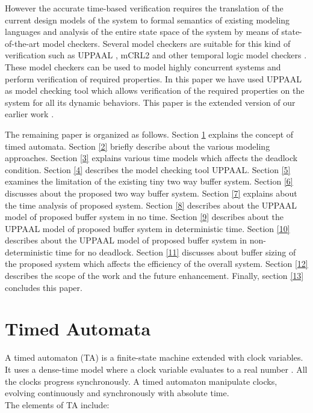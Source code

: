 \documentclass[letterpaper]{article}
\begin{document}
\par However the accurate time-based verification requires the translation of the current design models of the system to formal semantics of existing modeling languages and analysis of the entire state space of the system by means of state-of-the-art model checkers. Several model checkers are suitable for this kind of verification such as UPPAAL \cite{GDK04}\cite{JKF95}, mCRL2 \cite{JAMY06} and other temporal logic model checkers \cite{WIKI12}. These model checkers can be used to model highly concurrent systems and perform verification of required properties. In this paper we have used UPPAAL as  model checking tool which allows  verification of the required properties on the system for all its dynamic behaviors. This paper is the extended version of our earlier work \cite{REF13}.
\par
The remaining paper is organized as follows. Section \ref{1} explains the concept of timed automata. Section \ref{2} briefly describe about the various modeling approaches. Section \ref{3} explains various time models which affects the deadlock condition. Section \ref{4} describes the model checking tool UPPAAL. Section \ref{5} examines the limitation of the existing tiny two way buffer system. Section \ref{6} discusses about the proposed two way buffer system.  Section \ref{7} explains about the time analysis of proposed system. Section \ref{8} describes about the UPPAAL model of proposed buffer system in no time. Section \ref{9} describes about the UPPAAL model of proposed buffer system in deterministic time. Section \ref{10} describes about the UPPAAL model of proposed buffer system in non-deterministic time for no deadlock. Section \ref{11} discusses about buffer sizing of the proposed system which affects the efficiency of the overall system. Section \ref{12} describes the scope of the work and the future enhancement. Finally, section \ref{13} concludes this paper.

\section{Timed Automata}
\label{1}
A timed automaton (TA) is a finite-state machine extended with clock variables. It uses a dense-time model where a clock variable evaluates to a real number \cite{PUK12}. All the clocks progress synchronously. A timed automaton manipulate clocks, evolving continuously and synchronously with absolute time.\\
 The elements of TA include:
    
\end{document}

